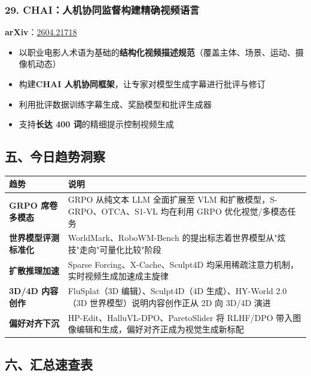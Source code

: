 \subsubsection{29. CHAI：人机协同监督构建精确视频语言}

\textbf{arXiv}：\href{https://arxiv.org/abs/2604.21718}{2604.21718}

\begin{itemize}[leftmargin=1.5em]
  \item 以职业电影人术语为基础的\textbf{结构化视频描述规范}（覆盖主体、场景、运动、摄像机动态）
  \item 构建\textbf{CHAI 人机协同框架}，让专家对模型生成字幕进行批评与修订
  \item 利用批评数据训练字幕生成、奖励模型和批评生成器
  \item 支持\textbf{长达 400 词}的精细提示控制视频生成
\end{itemize}

\subsection{五、今日趋势洞察}

\small
\begin{longtable}{p{3.2cm}p{10.5cm}}
\toprule
趋势 & 说明 \\
\midrule
\textbf{GRPO 席卷多模态} & GRPO 从纯文本 LLM 全面扩展至 VLM 和扩散模型，S-GRPO、OTCA、S1-VL 均在利用 GRPO 优化视觉/多模态任务 \\
\textbf{世界模型评测标准化} & WorldMark、RoboWM-Bench 的提出标志着世界模型从"炫技"走向"可量化比较"阶段 \\
\textbf{扩散推理加速} & Sparse Forcing、X-Cache、Sculpt4D 均采用稀疏注意力机制，实时视频生成加速成主旋律 \\
\textbf{3D/4D 内容创作} & FluSplat（3D 编辑）、Sculpt4D（4D 生成）、HY-World 2.0（3D 世界模型）说明内容创作正从 2D 向 3D/4D 演进 \\
\textbf{偏好对齐下沉} & HP-Edit、HalluVL-DPO、ParetoSlider 将 RLHF/DPO 带入图像编辑和生成，偏好对齐正成为视觉生成新标配 \\
\bottomrule
\end{longtable}
\normalsize

\subsection{六、汇总速查表}

